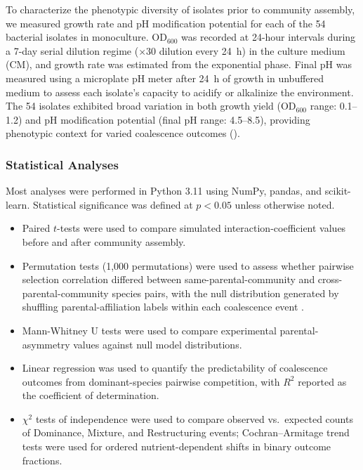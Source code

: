 To characterize the phenotypic diversity of isolates prior to community assembly, we measured growth rate and pH modification potential for each of the 54 bacterial isolates in monoculture. OD$_{600}$ was recorded at 24-hour intervals during a 7-day serial dilution regime ($\times$30 dilution every 24~h) in the culture medium (CM), and growth rate was estimated from the exponential phase. Final pH was measured using a microplate pH meter after 24~h of growth in unbuffered medium to assess each isolate's capacity to acidify or alkalinize the environment.  The 54 isolates exhibited broad variation in both growth yield (OD$_{600}$ range: 0.1--1.2) and pH modification potential (final pH range: 4.5--8.5), providing phenotypic context for varied coalescence outcomes ().


\subsubsection*{Statistical Analyses}
\label{sec:suppl:statistics}

Most analyses were performed in Python 3.11 using NumPy, pandas, and scikit-learn. Statistical significance was defined at $p < 0.05$ unless otherwise noted. 

\begin{itemize}
    \item Paired $t$-tests were used to compare simulated interaction-coefficient values before and after community assembly.
    \item Permutation tests (1,000 permutations) were used to assess whether pairwise selection correlation differed between same-parental-community and cross-parental-community species pairs, with the null distribution generated by shuffling parental-affiliation labels within each coalescence event .
    \item Mann-Whitney U tests were used to compare experimental parental-asymmetry values against null model distributions.
    \item Linear regression was used to quantify the predictability of coalescence outcomes from dominant-species pairwise competition, with $R^2$ reported as the coefficient of determination.
    \item $\chi^2$ tests of independence were used to compare observed vs.\ expected counts of Dominance, Mixture, and Restructuring events; Cochran--Armitage trend tests were used for ordered nutrient-dependent shifts in binary outcome fractions.
\end{itemize}
